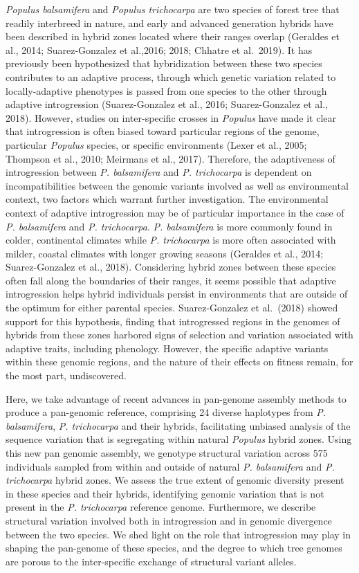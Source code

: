\documentclass[
]{agujournal2019}
\begin{document}
\emph{Populus balsamifera} and \emph{Populus trichocarpa} are two
species of forest tree that readily interbreed in nature, and early and
advanced generation hybrids have been described in hybrid zones located
where their ranges overlap (Geraldes et al., 2014; Suarez-Gonzalez et
al.,2016; 2018; Chhatre et al.~2019). It has previously been
hypothesized that hybridization between these two species contributes to
an adaptive process, through which genetic variation related to
locally-adaptive phenotypes is passed from one species to the other
through adaptive introgression (Suarez-Gonzalez et al., 2016;
Suarez-Gonzalez et al., 2018). However, studies on inter-specific
crosses in \emph{Populus} have made it clear that introgression is often
biased toward particular regions of the genome, particular
\emph{Populus} species, or specific environments (Lexer et al., 2005;
Thompson et al., 2010; Meirmans et al., 2017). Therefore, the
adaptiveness of introgression between \emph{P. balsamifera} and \emph{P.
trichocarpa} is dependent on incompatibilities between the genomic
variants involved as well as environmental context, two factors which
warrant further investigation. The environmental context of adaptive
introgression may be of particular importance in the case of \emph{P.
balsamifera} and \emph{P. trichocarpa}. \emph{P. balsamifera} is more
commonly found in colder, continental climates while \emph{P.
trichocarpa} is more often associated with milder, coastal climates with
longer growing seasons (Geraldes et al., 2014; Suarez-Gonzalez et al.,
2018). Considering hybrid zones between these species often fall along
the boundaries of their ranges, it seems possible that adaptive
introgression helps hybrid individuals persist in environments that are
outside of the optimum for either parental species. Suarez-Gonzalez et
al.~(2018) showed support for this hypothesis, finding that introgressed
regions in the genomes of hybrids from these zones harbored signs of
selection and variation associated with adaptive traits, including
phenology. However, the specific adaptive variants within these genomic
regions, and the nature of their effects on fitness remain, for the most
part, undiscovered.

Here, we take advantage of recent advances in pan-genome assembly
methods to produce a pan-genomic reference, comprising 24 diverse
haplotypes from \emph{P. balsamifera}, \emph{P. trichocarpa} and their
hybrids, facilitating unbiased analysis of the sequence variation that
is segregating within natural \emph{Populus} hybrid zones. Using this
new pan genomic assembly, we genotype structural variation across 575
individuals sampled from within and outside of natural \emph{P.
balsamifera} and \emph{P. trichocarpa} hybrid zones. We assess the true
extent of genomic diversity present in these species and their hybrids,
identifying genomic variation that is not present in the \emph{P.
trichocarpa} reference genome. Furthermore, we describe structural
variation involved both in introgression and in genomic divergence
between the two species. We shed light on the role that introgression
may play in shaping the pan-genome of these species, and the degree to
which tree genomes are porous to the inter-specific exchange of
structural variant alleles.
\end{document}
